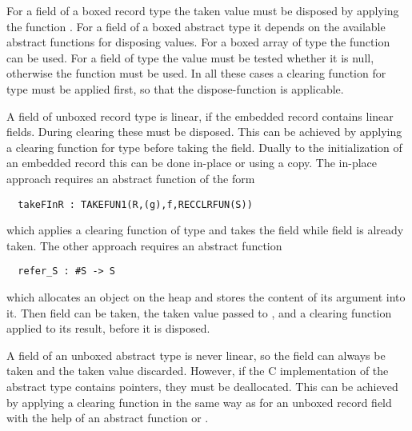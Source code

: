 For a field of a boxed record type  the taken value must be disposed by applying the function .
For a field of a boxed abstract type it depends on the available abstract functions for disposing values. For a boxed
array of type  the function  can be used. For a field of type
 the value must be tested whether it is null, otherwise the function  must be used. In
all these cases a clearing function for type  must be applied first, so that the dispose-function is applicable.

A field of unboxed record type  is linear, if the embedded record contains linear fields. During clearing these must be
disposed. This can be achieved by applying a clearing function for type  before taking the field. Dually to the 
initialization of an embedded record this can be done in-place or using a copy. The in-place approach requires an abstract
function of the form
\begin{verbatim}
  takeFInR : TAKEFUN1(R,(g),f,RECCLRFUN(S))
\end{verbatim}
which applies a clearing function of type  and takes the field  while field  is already taken.
The other approach requires an abstract function 
\begin{verbatim}
  refer_S : #S -> S
\end{verbatim}
which allocates an object on the heap and stores the content of its argument into it. Then field  can be taken, the taken
value passed to , and a clearing function applied to its result, before it is disposed.

A field of an unboxed abstract type is never linear, so the field can always be taken and the taken value discarded.
However, if the C implementation of the abstract type contains pointers, they must be deallocated. This can be achieved by
applying a clearing function in the same way as for an unboxed record field with the help of an abstract function
 or .
